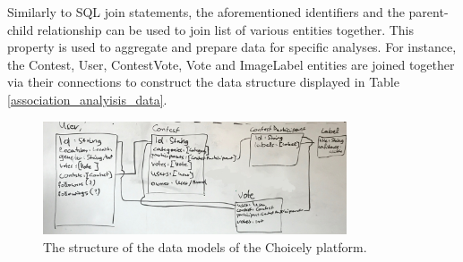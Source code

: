    Similarly to SQL join statements, the aforementioned identifiers and the parent-child relationship can be used to join list of various entities together. This property is used to aggregate and prepare data for specific analyses. For instance, the Contest, User, ContestVote, Vote and ImageLabel entities are joined together via their connections to construct the data structure displayed in Table \ref{association_analyisis_data}.


    \begin{figure}[h] 
		\begin{center}
            \includegraphics[width=0.8\textwidth]{Images/data_structure_whiteboard.jpg}
			\caption{The structure of the data models of the Choicely platform.}
			\label{choicely_data_models}
		\end{center}
    \end{figure}
